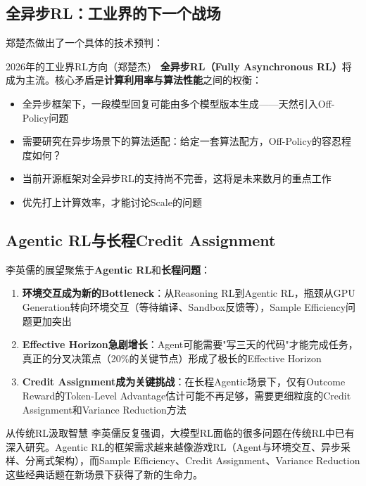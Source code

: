 \documentclass[a4paper]{article}
\begin{document}
\subsection{全异步RL：工业界的下一个战场}

郑楚杰做出了一个具体的技术预判：

\begin{importantbox}{2026年的工业界RL方向（郑楚杰）}
\textbf{全异步RL（Fully Asynchronous RL）}将成为主流。核心矛盾是\textbf{计算利用率与算法性能}之间的权衡：
\begin{itemize}
    \item 全异步框架下，一段模型回复可能由多个模型版本生成——天然引入Off-Policy问题
    \item 需要研究在异步场景下的算法适配：给定一套算法配方，Off-Policy的容忍程度如何？
    \item 当前开源框架对全异步RL的支持尚不完善，这将是未来数月的重点工作
    \item 优先打上计算效率，才能讨论Scale的问题
\end{itemize}
\end{importantbox}

\subsection{Agentic RL与长程Credit Assignment}

李英儒的展望聚焦于\textbf{Agentic RL}和\textbf{长程问题}：

\begin{enumerate}
    \item \textbf{环境交互成为新的Bottleneck}：从Reasoning RL到Agentic RL，瓶颈从GPU Generation转向环境交互（等待编译、Sandbox反馈等），Sample Efficiency问题更加突出
    \item \textbf{Effective Horizon急剧增长}：Agent可能需要"写三天的代码"才能完成任务，真正的分叉决策点（20\%的关键节点）形成了极长的Effective Horizon
    \item \textbf{Credit Assignment成为关键挑战}：在长程Agentic场景下，仅有Outcome Reward的Token-Level Advantage估计可能不再足够，需要更细粒度的Credit Assignment和Variance Reduction方法
\end{enumerate}

\begin{knowledgebox}{从传统RL汲取智慧}
李英儒反复强调，大模型RL面临的很多问题在传统RL中已有深入研究。Agentic RL的框架需求越来越像游戏RL（Agent与环境交互、异步采样、分离式架构），而Sample Efficiency、Credit Assignment、Variance Reduction这些经典话题在新场景下获得了新的生命力。
\end{knowledgebox}
\end{document}
